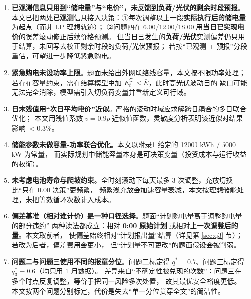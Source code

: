 \begin{enumerate}[label=(\arabic*), leftmargin=2.2em, itemsep=2pt]
\item \textbf{已观测信息只用到“储电量\nobreak”与“电价\nobreak”，未反馈到负荷/光伏的剩余时段预报}\nobreak。
本文已把两处\textbf{已观测}信息接入决策\nobreak：①每次调整以上一段\textbf{实际执行后的储电量}为起点（而非 LP 理想轨迹\nobreak）\nobreak；
②问题四在 6:00/12:00/18:00 用\textbf{当日已实现电价}的误差滚动修正后续价格预测\nobreak。
但当日已发生的\textbf{负荷/光伏}实测偏差仍只用于结算\nobreak，未回写去校正剩余时段的负荷/光伏预报\nobreak；
若按“已观测 + 预报\nobreak”分段重估\nobreak，可望进一步降低紧急购电\nobreak。
\item \textbf{紧急购电未设功率上限}\nobreak。题面未给出外网联络线容量\nobreak，本文按不限功率处理\nobreak；
若存在容量约束\nobreak，需在结算模型中加 $E^{\text{急}}_t\le \bar E$\nobreak，此时高光伏波动日的
缺口可能无法完全消除\nobreak，模型需引入切负荷变量并重新定义可行域\nobreak。
\item \textbf{日末残值用“次日平均电价\nobreak”近似}\nobreak。严格的滚动时域应求解跨日耦合的多日联合优化\nobreak；
本文用残值系数 $v=0.9\bar p$ 近似值函数\nobreak，灵敏度分析表明该近似对结果影响 $<0.3\text{\%}$\nobreak。
\item \textbf{储能参数未做容量-功率联合优化}\nobreak。本文以附录1 给定的 12000 kWh / 5000 kW 为常量\nobreak，
而实际规划中储能容量本身是可决策变量（投资成本与运行收益的权衡\nobreak）\nobreak。
\item \textbf{未考虑电池寿命与爬坡约束}\nobreak。全时刻滚动下每天最多 3 次调整\nobreak，充放切换比“只在 0:00 决策\nobreak”更频繁\nobreak，
频繁浅充放会加速容量衰减\nobreak，本文按理想储能处理\nobreak，未把等效循环次数计入成本\nobreak。
\item \textbf{偏差基准（相对谁计价\nobreak）是一种口径选择}\nobreak。题面“计划购电量高于调整购电量的部分违约\nobreak”
两种读法都成立\nobreak：相对 \textbf{0:00 原始计划\nobreak} 或相对\textbf{上一次调整后的量\nobreak}。本文取前者\nobreak，
使偏差始终相对“计划报出量\nobreak”结算（详见第 \ref{sec:q3} 节\nobreak）；若改为后者\nobreak，偏差费用会更小\nobreak，
但“计划量不可更改\nobreak”的题面假设会被削弱\nobreak。
\item \textbf{问题二与问题三使用不同的报童分位}\nobreak。问题二标定得 $q^*=0.7$\nobreak、问题三标定得 $q_3^*=0.6$（均只用 1 月数据\nobreak）\nobreak。
差异来自“不确定性被兑现的次数\nobreak”：问题三在多个时点反复调整\nobreak，等价于把同一风险多次处置\nobreak，
故其最优安全裕度更低\nobreak。本文按两个问题分别标定\nobreak，代价是失去“单一分位贯穿全文\nobreak”的简洁性\nobreak。
\end{enumerate}

